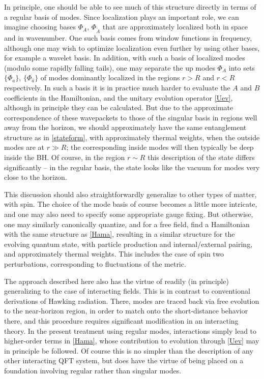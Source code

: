 \documentclass[12pt]{article}
\numberwithin{equation}{section}
\newcommand{\tA}{{\tilde A}}
\begin{document}
In principle, one should be able to see much of this structure directly in terms of a regular basis of modes.  Since localization plays an important role, we can imagine choosing bases $\Phi_A$, $\Phi_\tA$ that are approximately localized both in space and in wavenumber.  One such basis comes from window functions in frequency\cite{Hawk,GiNe}, although one may wish to optimize localization even further by using other bases, for example a wavelet basis.  In addition, with such a basis of localized modes (modulo some rapidly falling tails), one may separate the up modes $\Phi_A$ into sets $\{\Phi_a\}$, $\{\Phi_{\hat a}\}$ of modes dominantly localized in the regions $r>R$ and $r<R$ respectively.  In such a basis it is in practice much harder to evaluate the $A$ and $B$ coefficients in the Hamiltonian, and the unitary evolution operator \eqref{Uev}, although in principle they can be calculated.  But due to the approximate correspondence of these wavepackets to those of the singular basis in regions well away from the horizon, we should approximately have the same entanglement structure as in \eqref{stateform}, with approximately thermal weights, when the outside modes are at $r\gg R$; the corresponding inside modes will then typically be deep inside the BH.  Of course, in the region $r\sim R$ this description of the state differs significantly -- in the regular basis, the state looks like the vacuum for modes very close to the horizon\cite{SEHS,SE2d}.

This discussion should also straightforwardly generalize to other types of matter, with spin.  The choice of the mode basis of course becomes a little more intricate, and one may also need to specify some appropriate gauge fixing.  But otherwise, one may similarly canonically quantize, and for a free field, find a Hamiltonian with the same structure as \eqref{Hama}, resulting in a similar structure for the evolving quantum state, with particle production and internal/external pairing, and approximately thermal weights.  This includes the case of spin two perturbations, corresponding to fluctuations of the metric.

The approach described here also has the virtue of readily (in principle) generalizing to the case of interacting fields.  This is in contrast to conventional derivations of Hawking radiation.  There, modes are traced back via free evolution to the near-horizon region, in order to match onto the short-distance behavior there, and this procedure requires significant modification in an interacting theory.  In the present treatment using regular modes, interactions simply lead to higher-order terms in \eqref{Hama}, whose contribution to evolution through \eqref{Uev} may in principle be followed.  Of course this is no simpler than the description of any other interacting QFT system, but does have the virtue of being placed on a foundation involving regular rather than singular modes.
\end{document}
